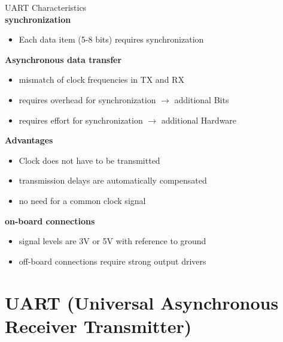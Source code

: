 \begin{concept}{UART Characteristics}
    \vspace{2mm}\\
    \textbf{synchronization}
    \begin{itemize}
        \item Each data item (5-8 bits) requires synchronization
    \end{itemize}
    \vspace{2mm}

    \textbf{Asynchronous data transfer}
    \begin{itemize}
        \item mismatch of clock frequencies in TX and RX
        \item requires overhead for synchronization $\rightarrow$ additional Bits
        \item requires effort for synchronization $\rightarrow$ additional Hardware
    \end{itemize}
    \vspace{2mm}

    \textbf{Advantages}
    \begin{itemize}
        \item Clock does not have to be transmitted
        \item transmission delays are automatically compensated
        \item no need for a common clock signal
    \end{itemize}
    \vspace{2mm}
    
    \textbf{on-board connections}
    \begin{itemize}
        \item signal levels are 3V or 5V with reference to ground
        \item off-board connections require strong output drivers
    \end{itemize}
\end{concept}



\section{UART (Universal Asynchronous Receiver Transmitter)}

